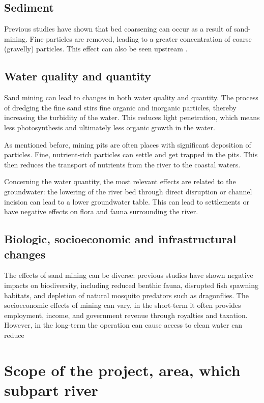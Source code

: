 \subsection{Sediment}
Previous studies have shown that bed coarsening can occur as a result of sand-mining. Fine particles are removed, leading to a greater concentration of coarse (gravelly) particles. This effect can also be seen upstream \autocite{sand-mining-boek}.

\subsection{Water quality and quantity}
Sand mining can lead to changes in both water quality and quantity. The process of dredging the fine sand stirs fine organic and inorganic particles, thereby increasing the turbidity of the water. This reduces light penetration, which means less photosynthesis and ultimately less organic growth in the water.

As mentioned before, mining pits are often places with significant deposition of particles. Fine, nutrient-rich particles can settle and get trapped in the pits. This then reduces the transport of nutrients from the river to the coastal waters.

Concerning the water quantity, the most relevant effects are related to the groundwater: the lowering of the river bed through direct disruption or channel incision can lead to a lower groundwater table. This can lead to settlements or have negative effects on flora and fauna surrounding the river.

\subsection{Biologic, socioeconomic and infrastructural changes}
The effects of sand mining can be diverse: previous studies have shown negative impacts on biodiversity, including reduced benthic fauna, disrupted fish spawning habitats, and depletion of natural mosquito predators such as dragonflies. The socioeconomic effects of mining can vary, in the short-term it often provides employment, income, and government revenue through royalties and taxation. However, in the long-term the operation can cause access to clean water can reduce

\section{Scope of the project, area, which subpart river}


